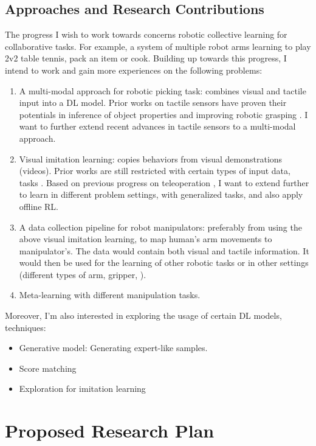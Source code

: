 \subsection{Approaches and Research Contributions}
The progress I wish to work towards concerns robotic collective learning for collaborative tasks. For example, a system of multiple robot arms learning to play 2v2 table tennis, pack an item or cook. Building up towards this progress, I intend to work and gain more experiences on the following problems:

\begin{enumerate}
	\item A multi-modal approach for robotic picking task: combines visual and tactile input into a \ac{DL} model. Prior works on tactile sensors have proven their potentials in inference of object properties \cite{luo2017robotic} and improving robotic grasping \cite{yamaguchi2019recent}. I want to further extend recent advances in tactile sensors to a multi-modal approach.
	\item Visual imitation learning: copies behaviors from visual demonstrations (videos). Prior works are still restricted with certain types of input data, tasks \cite{finn2017one, sharma2019third}. 	Based on previous progress on teleoperation \cite{handa2020dexpilot}, I want to extend further to learn in different problem settings, with generalized tasks, and also apply offline \ac{RL}.
	\item A data collection pipeline for robot manipulators: preferably from using the above visual imitation learning, to map human’s arm movements to manipulator's. The data would contain both visual and tactile information. It would then be used for the learning of other robotic tasks or in other settings (different types of arm, gripper, \etc).
	\item Meta-learning with different manipulation tasks.
\end{enumerate}

Moreover, I'm also interested in exploring the usage of certain \ac{DL} models, techniques:
\begin{itemize}
	\item Generative model: Generating expert-like samples.
	\item Score matching
	\item Exploration for imitation learning
\end{itemize}

\section{Proposed Research Plan}


